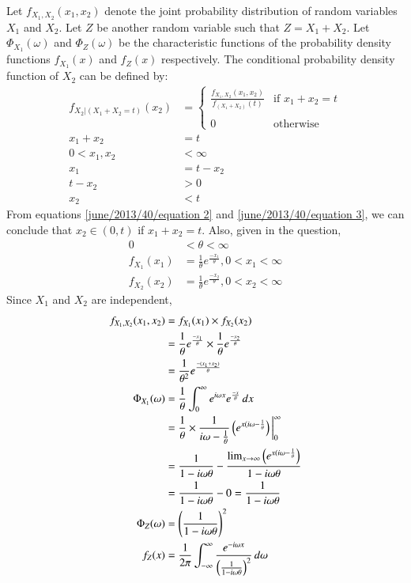 Let $f_{X_1,X_2}(x_1,x_2)$ denote the joint probability distribution of random variables $X_1$ and $X_2$. Let $Z$ be another random variable such that $Z=X_1+X_2$. Let $\Phi_{X_1}(\omega)$ and $\Phi_{Z}(\omega)$ be the characteristic functions of the probability density functions $f_{X_1}(x)$ and $f_{Z}(x)$ respectively. The conditional probability density function of $X_2$ can be defined by:
\begin{align}
    f_{X_2|(X_1+X_2=t)}(x_2) &= 
    \begin{cases}
    \frac{f_{X_1,X_2}(x_1,x_2)}{f_{(X_1+X_2)}(t)} &  \text{if }x_1+x_2=t\\ ~\\[-1em]
    0 & \text{otherwise}
    \end{cases}
    \\ x_1 + x_2 &= t
    \\ 0 < x_1, x_2&< \infty \label{june/2013/40/equation 2}
    \\ x_1 &= t-x_2
    \\ t - x_2 &> 0
    \\ x_2 &< t \label{june/2013/40/equation 3}
\end{align}
From equations \eqref{june/2013/40/equation 2} and \eqref{june/2013/40/equation 3}, we can conclude that $x_2 \in (0, t)$ if $x_1+x_2=t$. Also, given in the question,
\begin{align}
    0 &< \theta < \infty
    \\f_{X_1}(x_1) &= \frac{1}{\theta}e^{\frac{-x_1}{\theta}}, 0<x_1<\infty
    \\f_{X_2}(x_2) &= \frac{1}{\theta}e^{\frac{-x_2}{\theta}}, 0<x_2<\infty
\end{align}
Since $X_1$ and $X_2$ are independent, 
\begin{align}
f_{X_1,X_2}(x_1,x_2) &= f_{X_1}(x_1) \times f_{X_2}(x_2)
    \\&= \frac{1}{\theta}e^{\frac{-x_1}{\theta}} \times \frac{1}{\theta}e^{\frac{-x_2}{\theta}}
    \\&= \frac{1}{\theta^2}e^{\frac{-(x_1+x_2)}{\theta}}
    \\\Phi_{X_1}(\omega) &= \frac{1}{\theta} \int_{0}^{\infty}e^{i\omega x} e^{\frac{-x}{\theta}} \,dx
    \\ &= \frac{1}{\theta} \times \frac{1}{i\omega - \frac{1}{\theta}} \left(e^{x(i\omega - \frac{1}{\theta}}\right)\bigg\vert_0^{\infty}
    \\ &= \frac{1}{1-i\omega\theta} - \frac{\lim_{x\rightarrow \infty} \left(e^{x(i\omega - \frac{1}{\theta}}\right)}{1-i\omega\theta}
    \\&= \frac{1}{1-i\omega\theta} - 0 = \frac{1}{1-i\omega\theta} 
    \\ \Phi_{Z}(\omega) &= \left(\frac{1}{1-i\omega\theta} \right)^2
    \\ f_Z(x) &= \frac{1}{2\pi} \int_{-\infty}^{\infty}\frac{e^{-i\omega x}}{\left(\frac{1}{1-i\omega\theta} \right)^2} \,d\omega \label{june/2013/40/equation 1}
\end{align}
